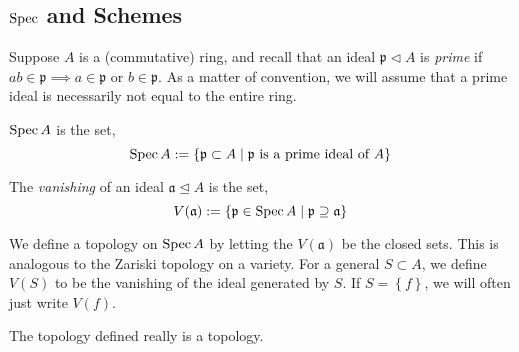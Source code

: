 \documentclass[000-main.tex]{subfiles}
\begin{document}
\subsection{$\operatorname{Spec}$ and Schemes}%
\label{sec:schemes}

Suppose $A$ is a (commutative) ring, and recall that an ideal $\mathfrak{p}\triangleleft A$ is \emph{prime} if $ab\in\mathfrak{p}\implies a\in \mathfrak{p}$ or $b\in\mathfrak{p}$.
As a matter of convention, we will assume that a prime ideal is necessarily not equal to the entire ring.
\begin{definition}
  $\operatorname{Spec} A$ is the set,
  \begin{displaymath}
	\operatorname{Spec} A := \left\{ \mathfrak{p}\subset A \mid \mathfrak{p}\text{ is a prime ideal of } A\right\}
  \end{displaymath}

  The \emph{vanishing} of an ideal $\mathfrak{a}\trianglelefteq A$ is the set,
  \begin{displaymath}
	V(\mathfrak{a}) := \left\{ \mathfrak{p}\in\operatorname{Spec} A \mid \mathfrak{p} \supseteq \mathfrak{a} \right\}
  \end{displaymath}
\end{definition}
We define a topology on $\operatorname{Spec} A$ by letting the $V(\mathfrak{a})$ be the closed sets. This is analogous to the Zariski topology on a variety.
For a general $S\subset A$, we define $V(S)$ to be the vanishing of the ideal generated by $S$.
If $S = \left\{ f \right\}$, we will often just write $V(f)$.

\begin{lemma}
	The topology defined really is a topology. 
\end{lemma} 
\end{document}
